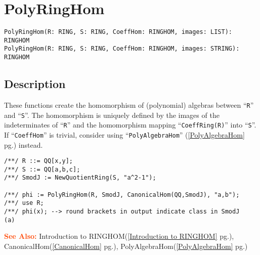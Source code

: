 \documentclass[a4paper]{mybook}
\newenvironment{command}{}{} %
\newcommand\SeeAlso{\par\textcolor{OrangeRed}{\textbf{\large See Also: }}}
\begin{document}
\section{PolyRingHom}
\label{PolyRingHom}
\begin{command} %


\begin{Verbatim}[label=syntax, rulecolor=\color{MidnightBlue},
frame=single]
PolyRingHom(R: RING, S: RING, CoeffHom: RINGHOM, images: LIST): RINGHOM
PolyRingHom(R: RING, S: RING, CoeffHom: RINGHOM, images: STRING): RINGHOM
\end{Verbatim}


\subsection*{Description}

These functions create the homomorphism of (polynomial) algebras between
``\verb&R&'' and ``\verb&S&''.  The homomorphism is uniquely defined by the images
of the indeterminates of ``\verb&R&'' and the homomorphism mapping ``\verb&CoeffRing(R)&'' into ``\verb&S&''.
If ``\verb&CoeffHom&'' is trivial, consider using ``\verb&PolyAlgebraHom&'' (\ref{PolyAlgebraHom} pg.\pageref{PolyAlgebraHom}) instead.
\begin{Verbatim}[label=example, rulecolor=\color{PineGreen}, frame=single]
/**/ R ::= QQ[x,y];
/**/ S ::= QQ[a,b,c];
/**/ SmodJ := NewQuotientRing(S, "a^2-1");

/**/ phi := PolyRingHom(R, SmodJ, CanonicalHom(QQ,SmodJ), "a,b");
/**/ use R;
/**/ phi(x); --> round brackets in output indicate class in SmodJ
(a)
\end{Verbatim}


\SeeAlso %
  Introduction to RINGHOM(\ref{Introduction to RINGHOM} pg.\pageref{Introduction to RINGHOM}), 
    CanonicalHom(\ref{CanonicalHom} pg.\pageref{CanonicalHom}), 
    PolyAlgebraHom(\ref{PolyAlgebraHom} pg.\pageref{PolyAlgebraHom})
\end{command} %
\end{document}
